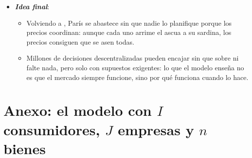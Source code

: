 \documentclass[11pt]{article}
\begin{document}
\begin{itemize}
\begin{itemize}
  \item {} lo intuyó en 1776: «No es de la benevolencia del carnicero, del cervecero o del panadero de la que esperamos nuestra cena, sino de su preocupación por su propio interés»;\footnote{«\emph{It is not from the benevolence of the butcher, the brewer, or the baker, that we expect our dinner, but from their regard to their own interest}»: \textcite[libro~I, cap.~II]{Smith1776Wealth} (traducción propia).}  y  demostraron en qué condiciones basta con eso.

  \item Cada supuesto que no se cumple señala dónde puede fallar el mercado y, por tanto, dónde puede tener sentido la intervención pública.
  \end{itemize}
\item \textbf{\emph{Idea final}}:
  \begin{itemize}
  \item Volviendo a , París se abastece sin que nadie lo planifique porque los precios coordinan: aunque cada uno arrime el ascua a su sardina, los precios consiguen que se asen todas.

  \item Millones de decisiones descentralizadas pueden encajar sin que sobre ni falte nada, pero solo con supuestos exigentes: lo que el modelo enseña no es que el mercado siempre funcione, sino por qué funciona cuando lo hace.
  \end{itemize}
\end{itemize}

\clearpage
\appendix

\section{Anexo: el modelo con $I$ consumidores,\cortetitulo{} $J$ empresas y $n$ bienes}\label{anexo:modelo-general}
\end{document}
